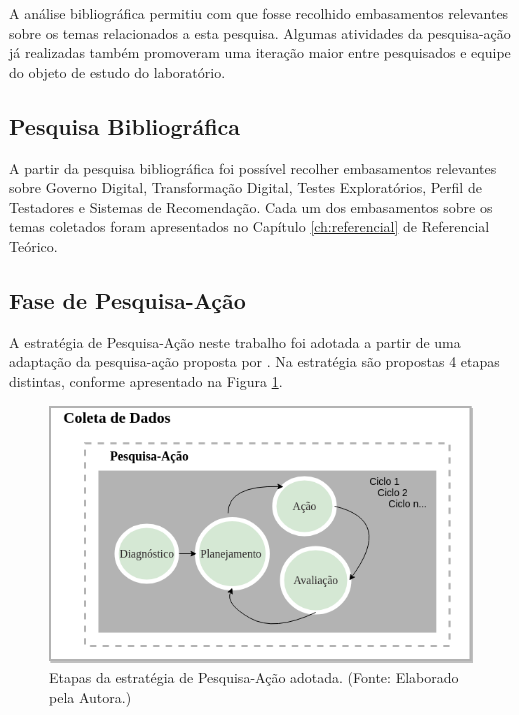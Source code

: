 A análise bibliográfica permitiu com que fosse recolhido embasamentos relevantes sobre os temas relacionados a esta pesquisa. Algumas atividades da pesquisa-ação já realizadas também promoveram uma iteração maior entre pesquisados e equipe do objeto de estudo do laboratório.

\subsection{Pesquisa Bibliográfica}

A partir da pesquisa bibliográfica foi possível recolher embasamentos relevantes sobre Governo Digital, Transformação Digital, Testes Exploratórios, Perfil de Testadores e Sistemas de Recomendação. Cada um dos embasamentos sobre os temas coletados foram apresentados no Capítulo \ref{ch:referencial} de Referencial Teórico.

\subsection{Fase de Pesquisa-Ação}
\label{sub:pesquisa-acao}

A estratégia de Pesquisa-Ação neste trabalho foi adotada a partir de uma adaptação da pesquisa-ação proposta por \cite{petersen2008systematic}. Na estratégia são propostas 4 etapas distintas, conforme apresentado na Figura \ref{fig:etapasPesquisaAcao}.

        \begin{figure}[H]
          \centering
          \includegraphics[width=12cm]{figuras/etapasPesquisaAcao.png}
          \caption{Etapas da estratégia de Pesquisa-Ação adotada. (Fonte: Elaborado pela Autora.)}
          \label{fig:etapasPesquisaAcao}

        \end{figure}

